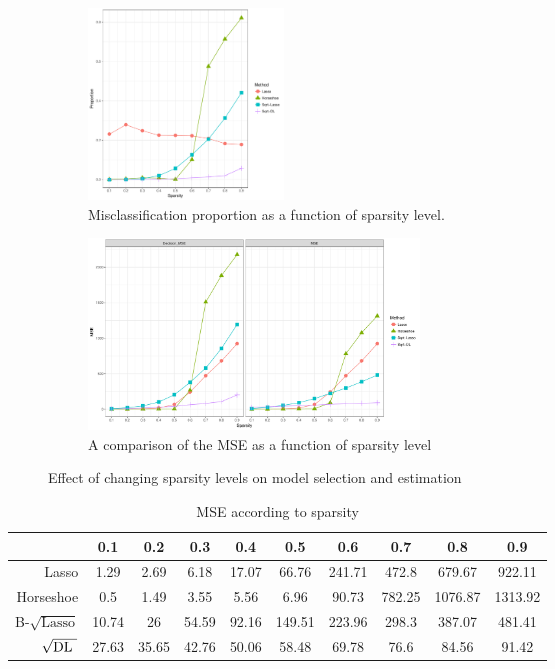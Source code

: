 \documentclass[10pt]{article}
\def\sql{$\sqrt{\text{Lasso}}$}
\def\sqdl{$\sqrt{\text{\rm{DL} }}$}
\begin{document}
\begin{figure}[ht!]
\centering
\begin{subfigure}[t]{0.8\linewidth}
\centering
\includegraphics[height = 2in, width =\linewidth]{Sparsity_MSP_n=p}
\caption{Misclassification proportion as a function of sparsity level.}
\label{fig:msp}

\end{subfigure}
\begin{subfigure}[t]{0.8\linewidth}
  \centering
  \includegraphics[height = 2in, width=\linewidth]{Sparsity_MSE_high_n=p}\caption{A comparison of the MSE as a function of sparsity level}
\label{fig:test}
\end{subfigure}
\caption{Effect of changing sparsity levels on model selection and estimation}
\label{fig:sparsity}
\end{figure}


\begin{table}[h!]
\caption{MSE according to sparsity}\label{MSE}
\begin{center}
\footnotesize{
\begin{tabular}{c|c|c|c|c|c|c|c|c|c|}
\cline{2-10}
    & 0.1  &  0.2  &  0.3  &  0.4  &  0.5 &   0.6  &  0.7  &  0.8 &   0.9 	\\
\hline
\multicolumn{1}{|r|}{Lasso} & 1.29 &  2.69 &  6.18 &  17.07 & 66.76 &  241.71 & 472.8 &  679.67 &  922.11	\\
\hline
\multicolumn{1}{|r|}{Horseshoe} &   0.5 &   1.49 &  3.55 &  5.56 &  6.96 &   90.73 &  782.25 & 1076.87 & 1313.92 \\
\hline
\multicolumn{1}{|r|}{B-\sql} & 10.74 & 26 &    54.59 & 92.16 & 149.51 & 223.96 & 298.3 &  387.07 &  481.41 \\
\hline
\multicolumn{1}{|r|}{\sqdl} & 27.63 & 35.65 & 42.76 & 50.06 & 58.48 &  69.78 &  76.6 &   84.56 &   91.42 \\
\hline
\end{tabular}}
\end{center}
\end{table}
\end{document}
